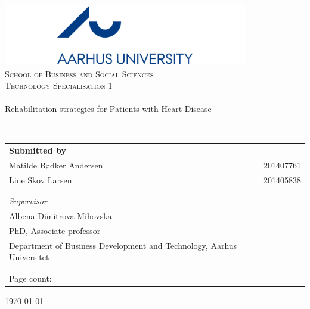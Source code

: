 \begin{titlingpage}
\begin{center}

~ \\[2.0cm]

\includegraphics[width=0.8\textwidth]{Figure/Ase} ~\\[0.5cm]

\textsc{\LARGE School of Business and Social Sciences}\\[0.5cm]

\textsc{\Large Technology Specialisation 1} ~\\[1.0cm]


\noindent\makebox[\linewidth]{\rule{\textwidth}{0.4pt}}\\
[0.5cm]{\Huge Rehabilitation strategies for Patients with Heart Disease }
\noindent\makebox[\linewidth]{\rule{\textwidth}{0.4pt}}

\end{center}
~ \\[0.5cm]



\begin{table}[H]
\begin{tabular}{ll}
\textbf{Submitted by} & \\
Matilde Bødker Andersen  & 201407761 \\
Line Skov Larsen & 201405838 \\

\\ \\
\textit{Supervisor} & \\
Albena Dimitrova Mihovska & \\
PhD, Associate professor & \\
Department of Business Development and Technology, Aarhus Universitet & \\[1ex]
\\ \\
Page count: \pageref{LastPage} & \\
\end{tabular}
\end{table}
		

\vfill

\begin{center}
{\large \today}

\end{center}


\end{titlingpage}

\cleardoublepage